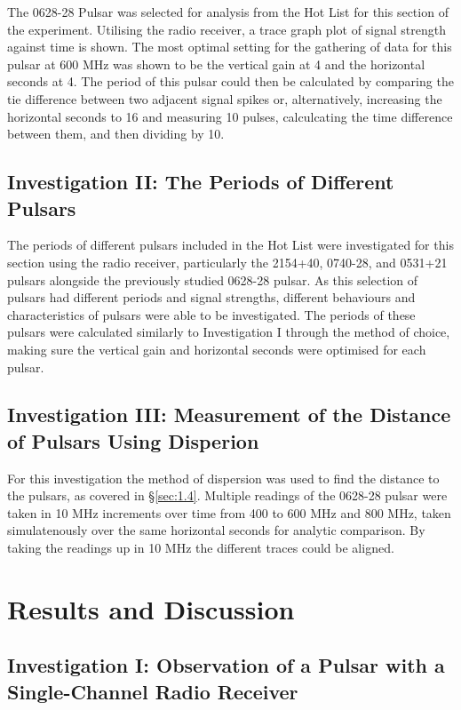 \documentclass[12pt]{article}
\begin{document}
The 0628-28 Pulsar was selected for analysis from the Hot List for this section of the experiment. Utilising the radio receiver, a trace graph plot of signal strength against time is shown. 
The most optimal setting for the gathering of data for this pulsar at 600 MHz was shown to be the vertical gain at 4 and the horizontal seconds at 4. The period of this pulsar could then be calculated by comparing the tie difference between two adjacent signal spikes or,
alternatively, increasing the horizontal seconds to 16 and measuring 10 pulses, calculcating the time difference between them, and then dividing by 10.

\subsection{Investigation II: The Periods of Different Pulsars}

The periods of different pulsars included in the Hot List were investigated for this section using the radio receiver, particularly the 2154+40, 0740-28, and 0531+21 pulsars alongside the previously studied 0628-28 pulsar. As this selection of pulsars had different periods and signal strengths, different behaviours and characteristics of pulsars were able to be investigated.
The periods of these pulsars were calculated similarly to Investigation I through the method of choice, making sure the vertical gain and horizontal seconds were optimised for each pulsar.

\subsection{Investigation III: Measurement of the Distance of Pulsars Using Disperion}

For this investigation the method of dispersion was used to find the distance to the pulsars, as covered in §\ref{sec:1.4}. Multiple readings of the 0628-28 pulsar were taken in 10 MHz increments over time from 400 to 600 MHz and 800 MHz, taken simulatenously over the same horizontal seconds for analytic comparison. By taking the readings up in 10 MHz the different traces could be aligned.

\newpage

\section{Results and Discussion} \label{sec:3}

\subsection{Investigation I: Observation of a Pulsar with a Single-Channel Radio Receiver}
\end{document}
